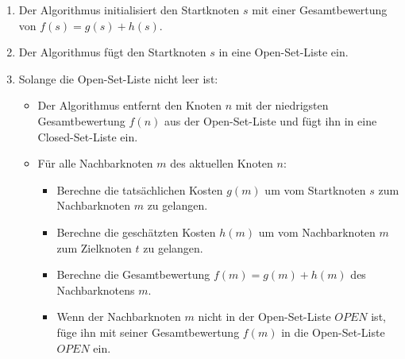\begin{enumerate}
    \item Der Algorithmus initialisiert den Startknoten $s$ mit einer Gesamtbewertung von $f(s) = g(s) + h(s)$.
    \item Der Algorithmus fügt den Startknoten $s$ in eine Open-Set-Liste  ein.
    \item Solange die Open-Set-Liste nicht leer ist:
    \begin{itemize}
        \item Der Algorithmus entfernt den Knoten $n$ mit der niedrigsten Gesamtbewertung $f(n)$ aus der Open-Set-Liste und fügt ihn in eine Closed-Set-Liste ein.
        \item Für alle Nachbarknoten $m$ des aktuellen Knoten $n$:
        \begin{itemize}
            \item Berechne die tatsächlichen Kosten $g(m)$ um vom Startknoten $s$ zum Nachbarknoten $m$ zu gelangen.
            \item Berechne die geschätzten Kosten $h(m)$ um vom Nachbarknoten $m$ zum Zielknoten $t$ zu gelangen.
            \item Berechne die Gesamtbewertung $f(m) = g(m) + h(m)$ des Nachbarknotens $m$.
            \item Wenn der Nachbarknoten $m$ nicht in der Open-Set-Liste $OPEN$ ist, füge ihn mit seiner Gesamtbewertung $f(m)$ in die Open-Set-Liste $OPEN$ ein.
        \end{itemize}
    \end{itemize}

\end{enumerate}


